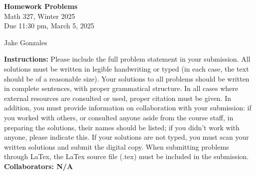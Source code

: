 \documentclass [10pt]{article}
\newcommand{\jg}[1]{{\color{blue} #1}}
\begin{document}
\begin{center}
{\bf Homework Problems}\\
Math 327, Winter 2025\\
Due 11:30 pm, March 5, 2025
\end{center}

\begin{center}
\jg{
    Jake Gonzales}
\end{center}


{\bf Instructions:} Please include the full problem statement in your submission.
All solutions must be written in legible handwriting
or typed (in each case, the text should be of a reasonable size). Your solutions to
all problems should be written in complete sentences, with proper grammatical
structure.
In all cases where external resources are consulted or used, proper citation must
be given. In addition,
you must provide information on collaboration with your submission: if you worked with others,
or consulted anyone aside from the course staff, in preparing the solutions, their
names should be
listed; if you didn't work with anyone, please indicate this.
If your solutions are not typed, you must scan your written solutions and submit
the digital copy. When submitting problems through LaTex, the LaTex source file
(.tex) must be included in the submission. \\


\jg{
\textbf{Collaborators: N/A }
}
\end{document}
